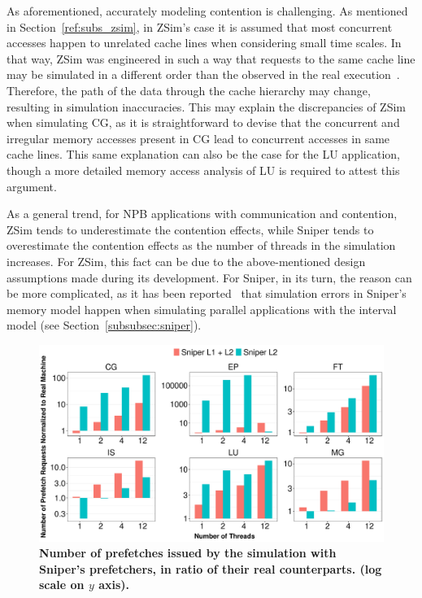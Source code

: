 \documentclass[AMA,final,STIX1COL]{WileyNJD-v2}
\newcommand\new[1]{{\color{red}\textbf{#1}}}
\begin{document}
As aforementioned, accurately modeling contention is challenging. 
As mentioned in Section~\ref{ref:subs_zsim}, in ZSim's case it is assumed that most concurrent accesses happen to unrelated cache lines when considering small time scales. 
In that way, ZSim was engineered in such a way that requests to the same cache line may be simulated in a different order than the observed in the real execution~\cite{sanchez2013zsim}.
Therefore, the path of the data through the cache hierarchy may change, resulting in simulation inaccuracies.
This may explain the discrepancies of ZSim when simulating CG, as it is straightforward to devise that the concurrent and irregular memory accesses present in CG lead to concurrent accesses in same cache lines.
This same explanation can also be the case for the LU application, though a more detailed memory access analysis of LU is required to attest this argument.

As a general trend, for NPB applications with communication and contention, ZSim tends to underestimate the contention effects, while Sniper tends to overestimate the contention effects as the number of threads in the simulation increases.
For ZSim, this fact can be due to the above-mentioned design assumptions made during its development. 
For Sniper, in its turn, the reason can be more complicated, as it has been reported~\cite{carlson2014aeohmcm} that simulation errors in Sniper's memory model happen when simulating parallel applications with the interval model (see Section~\ref{subsubsec:sniper}). 



\begin{figure}[!htb]
    \centering
    \includegraphics[width=\linewidth]{figures/prefetch-requests-real-sim.pdf}
    \caption{\new{Number of prefetches issued by the simulation with Sniper's prefetchers, in ratio of their real counterparts. (log scale on $y$ axis).}}
    \label{fig:sniper_l2-rqsts-all-pf}
\end{figure}
\end{document}
